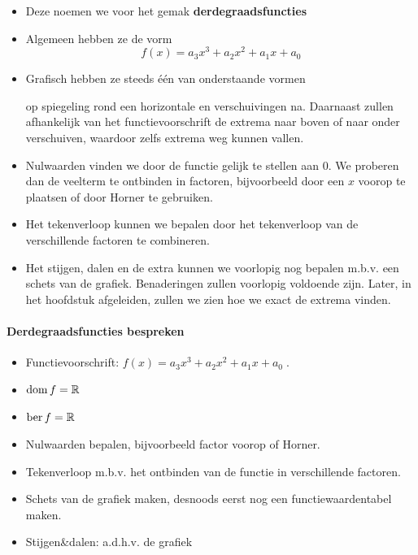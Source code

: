 \documentclass[12pt,twoside,a4paper]{article}
\begin{document}
\begin{itemize}
\item Deze noemen we voor het gemak {\bf derdegraadsfuncties}
\item Algemeen hebben ze de vorm
  \[f(x)=a_3x^3+a_2x^2+a_1x+a_0\]
\item Grafisch hebben ze steeds één van onderstaande vormen
  \begin{center}
  \end{center}
  op spiegeling rond een horizontale en verschuivingen na. Daarnaast zullen afhankelijk van het functievoorschrift de extrema naar boven of naar onder verschuiven, waardoor zelfs extrema weg kunnen vallen.
\item Nulwaarden vinden we door de functie gelijk te stellen aan 0. We proberen dan de veelterm te ontbinden in factoren, bijvoorbeeld door een $x$ voorop te plaatsen of door Horner te gebruiken.
\item Het tekenverloop kunnen we bepalen door het tekenverloop van de verschillende factoren te combineren.
\item Het stijgen, dalen en de extra kunnen we voorlopig nog bepalen m.b.v. een schets van de grafiek. Benaderingen zullen voorlopig voldoende zijn. Later, in het hoofdstuk afgeleiden, zullen we zien hoe we exact de extrema vinden.
\end{itemize}

\paragraph*{Derdegraadsfuncties bespreken}
\begin{mdframed}
  \begin{itemize}
  \item Functievoorschrift: $f(x)= a_3x^3+a_2x^2+a_1x+a_0\;.$
  \item $\dom f = \mathbb{R}$
  \item $\ber f = \mathbb{R}$
  \item Nulwaarden bepalen, bijvoorbeeld factor voorop of Horner.
  \item Tekenverloop m.b.v. het ontbinden van de functie in verschillende factoren.
  \item Schets van de grafiek maken, desnoods eerst nog een functiewaardentabel maken.
  \item Stijgen\&dalen: a.d.h.v. de grafiek
  \end{itemize}
\end{mdframed}
\end{document}
